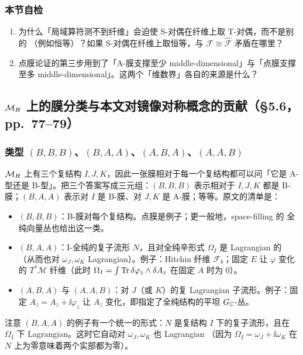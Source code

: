 \subsubsection*{本节自检}
\begin{enumerate}
\item 为什么「局域算符测不到纤维」会迫使 S-对偶在纤维上取 T-对偶，而不是别的
  （例如恒等）？如果 S-对偶在纤维上取恒等，与 $\mathcal F\cong\widehat{\mathcal F}$
  矛盾在哪里？
\item 点膜论证的第三步用到了「A-膜支撑至少 middle-dimensional」与「点膜支撑至多
  middle-dimensional」。这两个「维数界」各自的来源是什么？
\end{enumerate}

\subsection{$\mathcal{M}_H$ 上的膜分类与本文对镜像对称概念的贡献（§5.6，pp.~77--79）}
\label{sec:fh-brane}

\subsubsection*{类型 $(B,B,B)$、$(B,A,A)$、$(A,B,A)$、$(A,A,B)$}

$\mathcal{M}_H$ 上有三个复结构 $I,J,K$，因此一张膜相对于每一个复结构都可以问「它是 A-型还是
B-型」。把三个答案写成三元组：$(B,B,B)$ 表示相对于 $I,J,K$ 都是 B-膜；$(B,A,A)$
表示对 $I$ 是 B-膜、对 $J,K$ 是 A-膜；等等。原文的清单是：\pA{}
\begin{itemize}
\item $(B,B,B)$：B-膜对每个复结构。点膜是例子；更一般地，space-filling 的
  全纯向量丛也给出这一类。
\item $(B,A,A)$：I-全纯的复子流形 $N$，且对全纯辛形式 $\Omega_I$ 是 Lagrangian 的
  （从而也对 $\omega_J,\omega_K$ Lagrangian）。例子：Hitchin 纤维
  $\mathcal F_b$；固定 $E$ 让 $\varphi$ 变化的 $T^*\mathcal M$ 纤维（此时
  $\Omega_I=\int\operatorname{Tr}\delta\varphi_z\wedge\delta A_z$ 在固定 $A$ 时为 $0$）。
\item $(A,B,A)$ 与 $(A,A,B)$：对 $J$（或 $K$）的复 Lagrangian 子流形。例子：固定
  $A_z=A_z+\ii\varphi_z$ 让 $A_{\bar z}$ 变化，即指定了全纯结构的平坦 $G_{\mathbb{C}}$-丛。
\end{itemize}
注意 $(B,A,A)$ 的例子有一个统一的形式：$N$ 是复结构 $I$ 下的复子流形，且在
$\Omega_I$ 下 Lagrangian。这时它自动对 $\omega_J,\omega_K$ 也 Lagrangian
（因为 $\Omega_I=\omega_J+\ii\omega_K$ 在 $N$ 上为零意味着两个实部都为零）。
\pA{}

